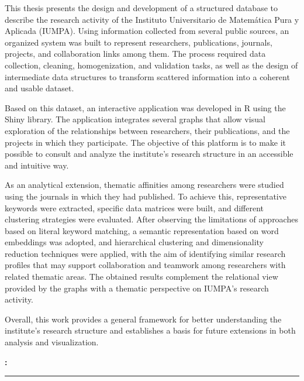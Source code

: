 \documentclass[11pt,spanish,listoffigures,listoftables]{tfgetsinf}
\renewenvironment{abstract}[1][catalan]{%
    \begingroup
    \selectlanguage{#1}\vspace{1em}\par\hfill
    {\sffamily\bfseries\Huge\abstractname}\par
    \vspace{0.5em}
}{%
    \par\noindent\textbf{\keywordsname:} \keywords
    \vspace{0.5em}
    \hrule
    \vspace{1em}
    \endgroup
}
\begin{document}
\begin{abstract}[english]
This thesis presents the design and development of a structured database to describe the research activity of the Instituto Universitario de Matemática Pura y Aplicada (IUMPA). Using information collected from several public sources, an organized system was built to represent researchers, publications, journals, projects, and collaboration links among them. The process required data collection, cleaning, homogenization, and validation tasks, as well as the design of intermediate data structures to transform scattered information into a coherent and usable dataset.

Based on this dataset, an interactive application was developed in R using the Shiny library. The application integrates several graphs that allow visual exploration of the relationships between researchers, their publications, and the projects in which they participate. The objective of this platform is to make it possible to consult and analyze the institute's research structure in an accessible and intuitive way.

As an analytical extension, thematic affinities among researchers were studied using the journals in which they had published. To achieve this, representative keywords were extracted, specific data matrices were built, and different clustering strategies were evaluated. After observing the limitations of approaches based on literal keyword matching, a semantic representation based on word embeddings was adopted, and hierarchical clustering and dimensionality reduction techniques were applied, with the aim of identifying similar research profiles that may support collaboration and teamwork among researchers with related thematic areas. The obtained results complement the relational view provided by the graphs with a thematic perspective on IUMPA's research activity.

Overall, this work provides a general framework for better understanding the institute's research structure and establishes a basis for future extensions in both analysis and visualization.
\end{abstract}

\cleardoublepage


\tableofcontents
\listoffigures
\listoftables
\end{document}
